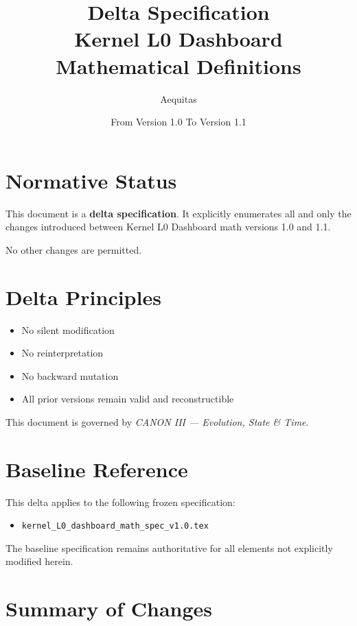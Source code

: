 \documentclass[11pt]{article}
\title{Delta Specification \\
Kernel L0 Dashboard Mathematical Definitions}
\author{Aequitas}
\date{From Version 1.0 To Version 1.1}
\newcommand{\OldVersion}{1.0}
\newcommand{\NewVersion}{1.1}
\begin{document}
\maketitle

\section*{Normative Status}
This document is a \textbf{delta specification}.
It explicitly enumerates all and only the changes introduced between
Kernel L0 Dashboard math versions \OldVersion{} and \NewVersion{}.

No other changes are permitted.

\section*{Delta Principles}
\begin{itemize}
  \item No silent modification
  \item No reinterpretation
  \item No backward mutation
  \item All prior versions remain valid and reconstructible
\end{itemize}

This document is governed by \emph{CANON III — Evolution, State \& Time}.

\section{Baseline Reference}

This delta applies to the following frozen specification:

\begin{itemize}
  \item \texttt{kernel\_L0\_dashboard\_math\_spec\_v\OldVersion{}.tex}
\end{itemize}

The baseline specification remains authoritative for all elements not
explicitly modified herein.

\section{Summary of Changes}
\end{document}
